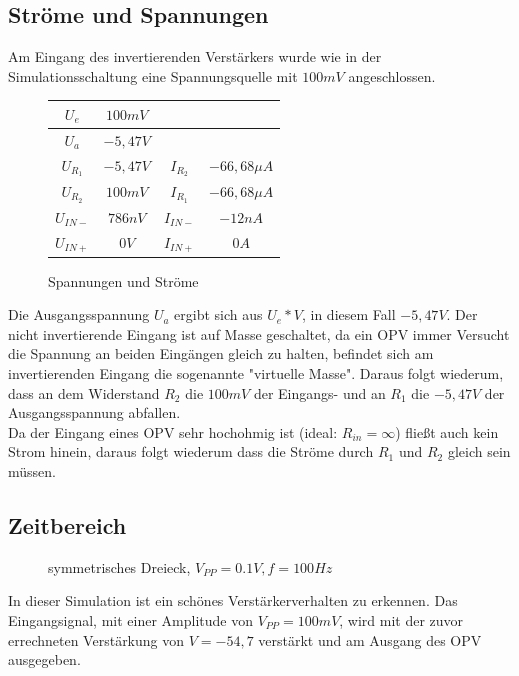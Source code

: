 \subsection{Str\"ome und Spannungen}
Am Eingang des invertierenden Verst\"arkers wurde wie in der Simulationsschaltung eine Spannungsquelle mit $100mV$ angeschlossen.

\begin{figure}[H]
  \centering
  \begin{tabular}{c|c||c|c}
    $U_e$ & $100mV$ & & \\ \hline
    $U_a$ & $-5,47V$ & & \\ \hline
    $U_{R_1}$ & $-5,47V$ & $I_{R_2}$ & $-66,68\mu A$  \\ \hline
    $U_{R_2}$ & $100mV$ & $I_{R_1}$ & $-66,68\mu A$  \\ \hline
    $U_{IN-}$ & $786nV$ & $I_{IN-}$ & $-12nA$  \\ \hline
    $U_{IN+}$ & $0V$ & $I_{IN+}$ & $0A$
  \end{tabular}
  \caption{Spannungen und Str\"ome}
\end{figure}
\noindent
Die Ausgangsspannung $U_a$ ergibt sich aus $U_e*V$, in diesem Fall $-5,47V$. Der nicht invertierende Eingang ist auf Masse geschaltet, da ein OPV immer Versucht die Spannung an
beiden Eing\"angen gleich zu halten, befindet sich am invertierenden Eingang die sogenannte "virtuelle Masse". Daraus folgt wiederum, dass an dem Widerstand $R_2$ die $100mV$ der
Eingangs- und an $R_1$ die $-5,47V$ der Ausgangsspannung abfallen. \\
Da der Eingang eines OPV sehr hochohmig ist (ideal: $R_{in}=\infty$) flie\ss{}t auch kein Strom hinein, daraus folgt wiederum dass die Str\"ome durch $R_1$ und $R_2$ gleich
sein m\"ussen.

\subsection{Zeitbereich}
\begin{figure}[H]
  \centering
  \caption{symmetrisches Dreieck, $V_{PP}=0.1V, f=100Hz$}
\end{figure}
\noindent
In dieser Simulation ist ein sch\"ones Verst\"arkerverhalten zu erkennen. Das Eingangsignal, mit einer Amplitude von $V_{PP} = 100mV$, wird mit der zuvor errechneten Verst\"arkung
von $V=-54,7$ verst\"arkt und am Ausgang des OPV ausgegeben.

